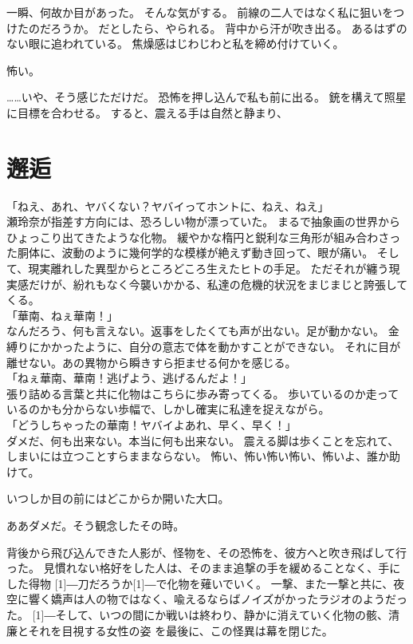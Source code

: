 \documentclass[autodetect-engine,dvipdfmx-if-dvi,a5paper,ja=standard,twoside,titlepage,final,twocolumn]{ltjtbook}
\begin{document}
一瞬、何故か目があった。
そんな気がする。
前線の二人ではなく私に狙いをつけたのだろうか。
だとしたら、やられる。
背中から汗が吹き出る。
あるはずのない眼に追われている。
焦燥感はじわじわと私を締め付けていく。

怖い。

……いや、そう感じただけだ。
恐怖を押し込んで私も前に出る。
銃を構えて照星に目標を合わせる。
すると、震える手は自然と静まり、
\section{\rm 邂逅}
「ねえ、あれ、ヤバくない？ヤバイってホントに、ねえ、ねえ」\\
瀬玲奈が指差す方向には、恐ろしい物が漂っていた。
まるで抽象画の世界からひょっこり出てきたような化物。
緩やかな楕円と鋭利な三角形が組み合わさった胴体に、波動のように幾何学的な模様が絶えず動き回って、眼が痛い。
そして、現実離れした異型からところどころ生えたヒトの手足。
ただそれが纏う現実感だけが、紛れもなく今襲いかかる、私達の危機的状況をまじまじと誇張してくる。\\
「華南、ねぇ華南！」\\
なんだろう、何も言えない。返事をしたくても声が出ない。足が動かない。
金縛りにかかったように、自分の意志で体を動かすことができない。
それに目が離せない。あの異物から瞬きすら拒ませる何かを感じる。\\
「ねぇ華南、華南！逃げよう、逃げるんだよ！」\\
張り詰める言葉と共に化物はこちらに歩み寄ってくる。
歩いているのか走っているのかも分からない歩幅で、しかし確実に私達を捉えながら。\\
「どうしちゃったの華南！ヤバイよあれ、早く、早く！」\\
ダメだ、何も出来ない。本当に何も出来ない。
震える脚は歩くことを忘れて、しまいには立つことすらままならない。
怖い、怖い怖い怖い、怖いよ、誰か助けて。

いつしか目の前にはどこからか開いた大口。

ああダメだ。そう観念したその時。

背後から飛び込んできた人影が、怪物を、その恐怖を、彼方へと吹き飛ばして行った。
見慣れない格好をした人は、そのまま追撃の手を緩めることなく、手にした得物
\scalebox{3}[1]{―}刀だろうか\scalebox{3}[1]{―}で化物を薙いでいく。
一撃、また一撃と共に、夜空に響く嬌声は人の物ではなく、喩えるならばノイズがかったラジオのようだった。
\scalebox{3}[1]{―}そして、いつの間にか戦いは終わり、静かに消えていく化物の骸、清廉とそれを目視する女性の姿
を最後に、この怪異は幕を閉じた。
\end{document}
